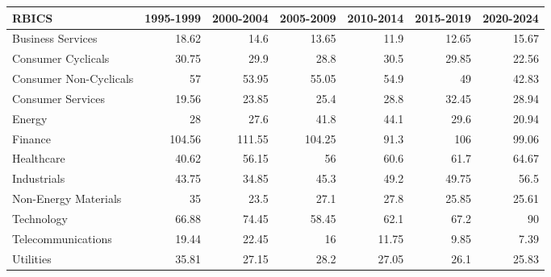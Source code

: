 \begin{tabular}{lrrrrrr}
\hline
 RBICS                  &   1995-1999 &   2000-2004 &   2005-2009 &   2010-2014 &   2015-2019 &   2020-2024 \\
\hline
 Business Services      &       18.62 &       14.6  &       13.65 &       11.9  &       12.65 &       15.67 \\
 Consumer Cyclicals     &       30.75 &       29.9  &       28.8  &       30.5  &       29.85 &       22.56 \\
 Consumer Non-Cyclicals &       57    &       53.95 &       55.05 &       54.9  &       49    &       42.83 \\
 Consumer Services      &       19.56 &       23.85 &       25.4  &       28.8  &       32.45 &       28.94 \\
 Energy                 &       28    &       27.6  &       41.8  &       44.1  &       29.6  &       20.94 \\
 Finance                &      104.56 &      111.55 &      104.25 &       91.3  &      106    &       99.06 \\
 Healthcare             &       40.62 &       56.15 &       56    &       60.6  &       61.7  &       64.67 \\
 Industrials            &       43.75 &       34.85 &       45.3  &       49.2  &       49.75 &       56.5  \\
 Non-Energy Materials   &       35    &       23.5  &       27.1  &       27.8  &       25.85 &       25.61 \\
 Technology             &       66.88 &       74.45 &       58.45 &       62.1  &       67.2  &       90    \\
 Telecommunications     &       19.44 &       22.45 &       16    &       11.75 &        9.85 &        7.39 \\
 Utilities              &       35.81 &       27.15 &       28.2  &       27.05 &       26.1  &       25.83 \\
\hline
\end{tabular}
